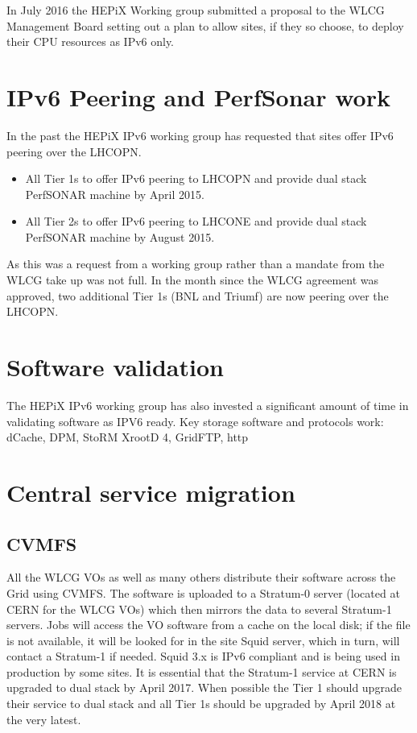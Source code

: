 \documentclass[a4paper]{jpconf}
\begin{document}
In July 2016 the HEPiX Working group submitted a proposal to the WLCG Management Board setting out a plan to allow sites, if they so choose, to deploy their CPU resources as IPv6 only.   


\section{IPv6 Peering and PerfSonar work}
In the past the HEPiX IPv6 working group has requested that sites offer IPv6 peering over the LHCOPN.
\begin{itemize}
\item All Tier 1s to offer IPv6 peering to LHCOPN and provide dual stack PerfSONAR machine by April 2015.
\item All Tier 2s to offer IPv6 peering to LHCONE and provide dual stack PerfSONAR machine by August 2015.
\end{itemize}
As this was a request from a working group rather than a mandate from the WLCG take up was not full.  In the month since the WLCG agreement was approved, two additional Tier 1s (BNL and Triumf) are now peering over the LHCOPN.

\section{Software validation}
The HEPiX IPv6 working group has also invested a significant amount of time in validating software as IPV6 ready. Key storage software and protocols work:
dCache, DPM, StoRM
XrootD 4, GridFTP, http



\section{Central service migration}
\subsection{CVMFS}
All the WLCG VOs as well as many others distribute their software across the Grid using CVMFS. The software is uploaded to a Stratum-0 server (located at CERN for the WLCG VOs) which then mirrors the data to several Stratum-1 servers\cite{Stratum1}.  Jobs will access the VO software from a cache on the local disk; if the file is not available, it will be looked for in the site Squid server, which in turn, will contact a Stratum-1 if needed.  Squid 3.x is IPv6 compliant and is being used in production by some sites.  It is essential that the Stratum-1 service at CERN is upgraded to dual stack by April 2017.  When possible the Tier 1 should upgrade their service to dual stack and all Tier 1s should be upgraded by April 2018 at the very latest.
\end{document}
